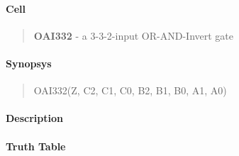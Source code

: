 \label{OAI332}
\paragraph{Cell}
\begin{quote}
    \textbf{OAI332} - a 3-3-2-input OR-AND-Invert gate
\end{quote}

\paragraph{Synopsys}
\begin{quote}
    OAI332(Z, C2, C1, C0, B2, B1, B0, A1, A0)
\end{quote}

\paragraph{Description}



\paragraph{Truth Table}


